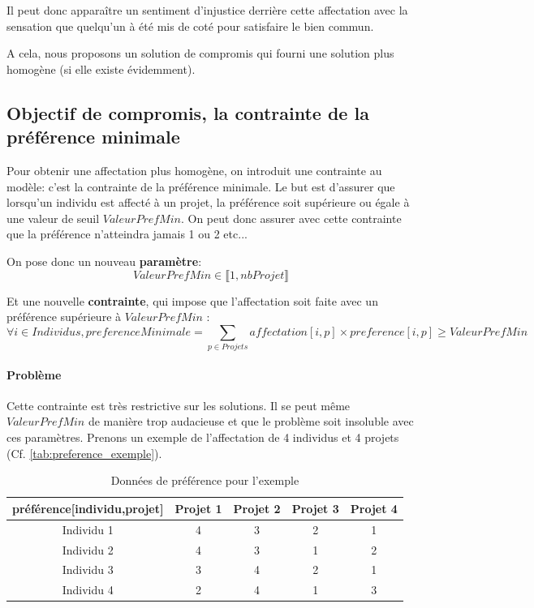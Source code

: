 \documentclass[final,poster]{polytech/polytech}
\begin{document}
Il peut donc apparaître un sentiment d'injustice derrière cette affectation avec la sensation que quelqu'un à été mis de coté pour satisfaire le bien commun.

A cela, nous proposons un solution de compromis qui fourni une solution plus homogène (si elle existe évidemment).

\subsection{Objectif de compromis, la contrainte de la préférence minimale}
\label{sec:pref_min}

Pour obtenir une affectation plus homogène, on introduit une contrainte au modèle: c'est la contrainte de la préférence minimale.
Le but est d'assurer que lorsqu'un individu est affecté à un projet, la préférence soit supérieure ou égale à une valeur de seuil $ValeurPrefMin$.
On peut donc assurer avec cette contrainte que la préférence n'atteindra jamais 1 ou 2 etc...

On pose donc un nouveau \textbf{paramètre}:
$$
ValeurPrefMin \in \llbracket 1,nbProjet \rrbracket
$$

Et une nouvelle \textbf{contrainte}, qui impose que l'affectation soit faite avec un préférence supérieure à $ValeurPrefMin$ :
$$
\forall i \in Individus ,preferenceMinimale = \sum_{p \in Projets} affectation[i,p]\times preference[i,p] \geqslant ValeurPrefMin
$$

\paragraph{Problème} Cette contrainte est très restrictive sur les solutions. Il se peut même $ValeurPrefMin$ de manière trop audacieuse et que le problème soit insoluble avec ces paramètres.
Prenons un exemple de l'affectation de 4 individus et 4 projets (Cf. \autoref{tab:preference_exemple}).

\begin{table}
\caption{\label{tab:preference_exemple}Données de préférence pour l'exemple}
\begin{tabular}{|c|c|c|c|c|}
\hline
préférence[individu,projet] & Projet 1 & Projet 2 & Projet 3 & Projet 4 \\
\hline
Individu 1 & 4 & 3 & 2 & 1 \\
\hline
Individu 2 & 4 & 3 & 1 & 2 \\
\hline
Individu 3 & 3 & 4 & 2 & 1 \\
\hline
Individu 4 & 2 & 4 & 1 & 3 \\
\hline
\end{tabular}
\end{table}
\end{document}
